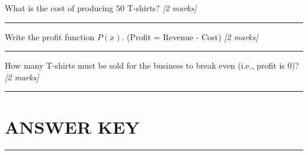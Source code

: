 \documentclass[12pt,a4paper]{article}
\begin{document}
\begin{subpartlist}
  \item What is the cost of producing $50$ T-shirts? \hfill\textit{[2 marks]}
  \vspace{18pt}
  \noindent\rule{0.75\linewidth}{0.2pt}
  \item Write the profit function $P(x)$. (Profit = Revenue - Cost) \hfill\textit{[2 marks]}
  \vspace{18pt}
  \noindent\rule{0.75\linewidth}{0.2pt}
  \item How many T-shirts must be sold for the business to break even (i.e., profit is $0$)? \hfill\textit{[2 marks]}
  \vspace{18pt}
  \noindent\rule{0.75\linewidth}{0.2pt}
\end{subpartlist}
\vspace{6pt}
\clearpage
\section*{ANSWER KEY}
\noindent\rule{\linewidth}{0.4pt}
\vspace{4pt}
\end{document}
